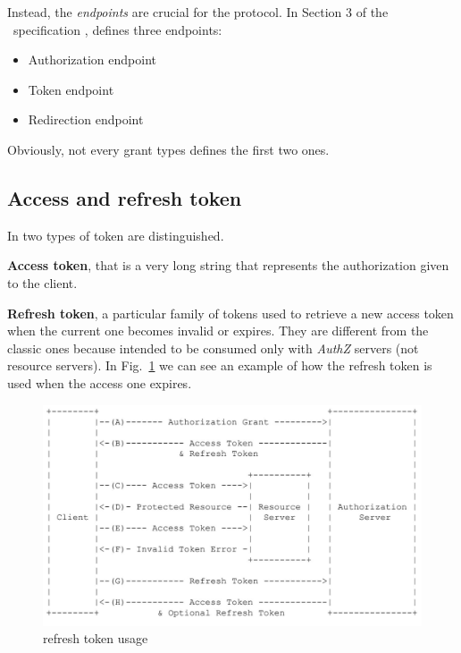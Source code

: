 Instead, the \textit{endpoints} are crucial for the protocol. In Section 3 of the \ specification \cite{RFC6749}, \textit{\oauth} defines three endpoints:

\begin{itemize}
    \item Authorization endpoint
    \item Token endpoint
    \item Redirection endpoint
\end{itemize}

Obviously, not every grant types defines the first two ones.

\subsection{Access and refresh token}
\label{accref}
In \textit{\oauth} two types of token are distinguished.

\textbf{Access token}, that is a very long string that represents the authorization given to the client.

\textbf{Refresh token}, a particular family of tokens used to retrieve a new access token when the current one becomes invalid or expires. They are different from the classic ones because intended to be consumed only with \textit{AuthZ} servers (not resource servers). In Fig.~\ref{fig:refreshtok} we can see an example of how the refresh token is used when the access one expires.

\begin{figure}
    \centering
    \includegraphics[scale=0.5]{chapters/images/chp2/tokenref.jpg}
    \caption{ refresh token usage}
    \label{fig:refreshtok}
\end{figure}

